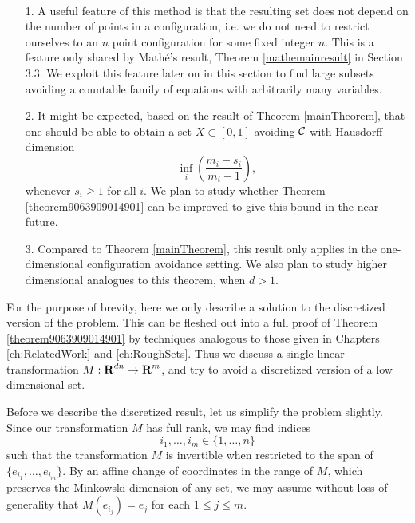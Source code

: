 \begin{remarks}
    \
    \begin{enumerate}
        \item[1.] A useful feature of this method is that the resulting set does not depend on the number of points in a configuration, i.e. we do not need to restrict ourselves to an $n$ point configuration for some fixed integer $n$. This is a feature only shared by Math\'{e}'s result, Theorem \ref{mathemainresult} in Section 3.3. We exploit this feature later on in this section to find large subsets avoiding a countable family of equations with arbitrarily many variables.

        \item[2.] It might be expected, based on the result of Theorem \ref{mainTheorem}, that one should be able to obtain a set $X \subset [0,1]$ avoiding $\operatorname{\mathcal{C}}$ with Hausdorff dimension
        \[ \inf_i \left( \frac{m_i - s_i}{m_i - 1} \right), \]
        whenever $s_i \geq 1$ for all $i$. We plan to study whether Theorem \ref{theorem9063909014901} can be improved to give this bound in the near future.

        \item[3.] Compared to Theorem \ref{mainTheorem}, this result only applies in the one-dimensional configuration avoidance setting. We also plan to study higher dimensional analogues to this theorem, when $d > 1$.
    \end{enumerate}
\end{remarks}

For the purpose of brevity, here we only describe a solution to the discretized version of the problem. This can be fleshed out into a full proof of Theorem \ref{theorem9063909014901} by techniques analogous to those given in Chapters \ref{ch:RelatedWork} and \ref{ch:RoughSets}. Thus we discuss a single linear transformation $M: \operatorname{\mathbf{R}}^{dn} \to \operatorname{\mathbf{R}}^m$, and try to avoid a discretized version of a low dimensional set.

Before we describe the discretized result, let us simplify the problem slightly. Since our transformation $M$ has full rank, we may find indices
%
\[ i_1, \dots, i_m \in \{ 1, \dots, n \} \]
%
such that the transformation $M$ is invertible when restricted to the span of $\{ e_{i_1}, \dots, e_{i_m} \}$. By an affine change of coordinates in the range of $M$, which preserves the Minkowski dimension of any set, we may assume without loss of generality that $M(e_{i_j}) = e_j$ for each $1 \leq j \leq m$.

